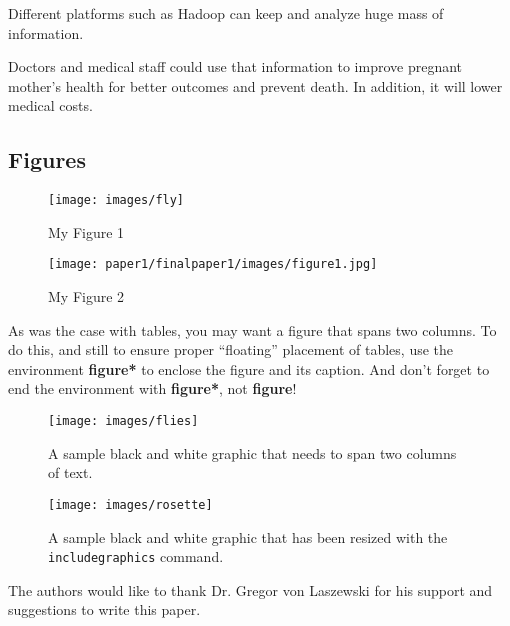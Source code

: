 \documentclass[sigconf]{acmart}
\begin{document}
Different platforms such as Hadoop can keep and analyze huge mass of information.

Doctors and medical staff could use that information to improve pregnant mother’s health for better outcomes and prevent death. 
In addition, it will lower medical costs.

\subsection{Figures}

\begin{figure}
\texttt{[image: images/fly]}
\caption{My Figure 1}
\end{figure}

\begin{figure}
\texttt{[image: paper1/finalpaper1/images/figure1.jpg]}
\caption{My Figure 2}
\end{figure}


As was the case with tables, you may want a figure that spans two
columns.  To do this, and still to ensure proper ``floating''
placement of tables, use the environment \textbf{figure*} to enclose
the figure and its caption.  And don't forget to end the environment
with \textbf{figure*}, not \textbf{figure}!

\begin{figure*}
\texttt{[image: images/flies]}
\caption{A sample black and white graphic
that needs to span two columns of text.}
\end{figure*}


\begin{figure}
\texttt{[image: images/rosette]}
\caption{A sample black and white graphic that has
been resized with the \texttt{includegraphics} command.}
\end{figure}


\begin{acks}

  The authors would like to thank Dr. Gregor von Laszewski for his
  support and suggestions to write this paper.

\end{acks}


 
\end{document}

